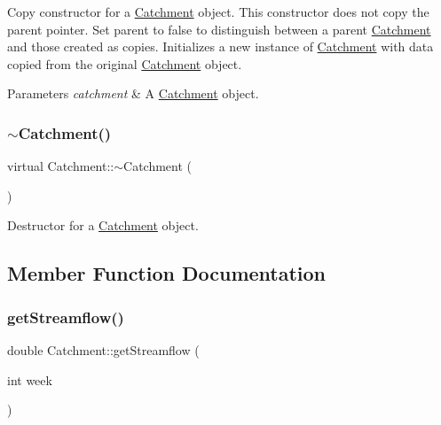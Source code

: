 Copy constructor for a \mbox{\hyperlink{classCatchment}{Catchment}} object. This constructor does not copy the parent pointer. Set parent to false to distinguish between a parent \mbox{\hyperlink{classCatchment}{Catchment}} and those created as copies. Initializes a new instance of \mbox{\hyperlink{classCatchment}{Catchment}} with data copied from the original \mbox{\hyperlink{classCatchment}{Catchment}} object. 


\begin{DoxyParams}{Parameters}
{\em catchment} & A \mbox{\hyperlink{classCatchment}{Catchment}} object. \\
\hline
\end{DoxyParams}
\mbox{\label{classCatchment_ad12bc6d64d4bd5133ac1086a52e240b3}} 
\subsubsection{\texorpdfstring{$\sim$\+Catchment()}{~Catchment()}}
{\footnotesize\ttfamily virtual Catchment\+::$\sim$\+Catchment (\begin{DoxyParamCaption}{ }\end{DoxyParamCaption})\hspace{0.3cm}{\ttfamily [virtual]}}



Destructor for a \mbox{\hyperlink{classCatchment}{Catchment}} object. 



\subsection{Member Function Documentation}
\mbox{\label{classCatchment_af4e8206ffab5c901e5e4cdd6136f73a1}} 
\subsubsection{\texorpdfstring{get\+Streamflow()}{getStreamflow()}}
{\footnotesize\ttfamily double Catchment\+::get\+Streamflow (\begin{DoxyParamCaption}\item[{int}]{week }\end{DoxyParamCaption})}



